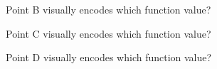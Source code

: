 \documentclass{ximera}
\begin{document}
\begin{exercise}
Point B visually encodes which function value?

\begin{multipleChoice}
\end{multipleChoice}
\end{exercise}






\begin{exercise}
Point C visually encodes which function value?

\begin{multipleChoice}
\end{multipleChoice}
\end{exercise}




\begin{exercise}
Point D visually encodes which function value?

\begin{multipleChoice}
\end{multipleChoice}
\end{exercise}
\end{document}
